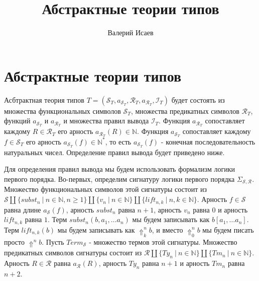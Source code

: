 \documentclass{amsart}
\theoremstyle{definition}
\theoremstyle{remark}
\numberwithin{figure}{section}
\begin{document}
\title{Абстрактные теории типов}

\author{Валерий Исаев}


\maketitle

\section{Абстрактные теории типов}

Асбтрактная теория типов $T = (\mathcal{S}_T, a_{\mathcal{S}_T}, \mathcal{R}_T, a_{\mathcal{R}_T}, \mathcal{I}_T)$ будет состоять из множества функциональных символов $\mathcal{S}_T$, множества предикатных символов $\mathcal{R}_T$, функций $a_{\mathcal{S}_T}$ и $a_{\mathcal{R}_T}$ и множества правил вывода $\mathcal{I}_T$.
Функция $a_{\mathcal{R}_T}$ сопоставляет каждому $R \in \mathcal{R}_T$ его арность $a_{\mathcal{R}_T}(R) \in \mathbb{N}$.
Функция $a_{\mathcal{S}_T}$ сопоставляет каждому $f \in \mathcal{S}_T$ его арность $a_{\mathcal{S}_T}(f) \in \mathbb{N}^*$, то есть $a_{\mathcal{S}_T}(f)$ - конечная последовательность натуральных чисел.
Определение правил вывода будет приведено ниже.

Для определения правил вывода мы будем использовать формализм логики первого порядка.
Во-первых, определим сигнатуру логики первого порядка $\Sigma_{\mathcal{S}, \mathcal{R}}$.
Множество функциональных символов этой сигнатуры состоит из $\mathcal{S} \amalg \{ subst_n\ |\ n \in \mathbb{N}, n \geq 1 \} \amalg \{ v_n\ |\ n \in \mathbb{N} \} \amalg \{ lift_{n,k}\ |\ n, k \in \mathbb{N} \} $.
Арность $f \in \mathcal{S}$ равна длине $a_\mathcal{S}(f)$, арность $subst_n$ равна $n + 1$, арность $v_n$ равна $0$ и арность $lift_{n,k}$ равна $1$.
Терм $subst_n(b, a_1, \ldots a_n)$ мы будем записывать как $b[a_1, \ldots a_n]$.
Терм $lift_{n,k}(b)$ мы будем записывать как $\Uparrow^n_k b$, и вместо $\Uparrow^n_0 b$ мы будем писать просто $\Uparrow^n b$.
Пусть $Term_{\mathcal{S}}$ - множество термов этой сигнатуры.
Множество предикатных символов сигнатуры состоит из $\mathcal{R} \amalg \{ Ty_n\ |\ n \in \mathbb{N} \} \amalg \{ Tm_n\ |\ n \in \mathbb{N} \}$.
Арность $R \in \mathcal{R}$ равна $a_\mathcal{R}(R)$, арность $Ty_n$ равна $n + 1$ и арность $Tm_n$ равна $n + 2$.
\end{document}
